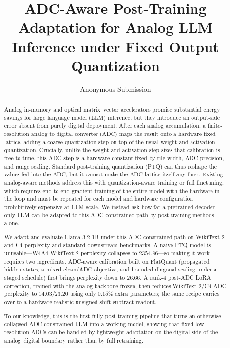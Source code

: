 \documentclass[letterpaper]{article} %
\title{ADC-Aware Post-Training Adaptation for Analog LLM Inference under Fixed Output Quantization}
\author{Anonymous Submission}
\theoremstyle{plain}
\begin{document}
\maketitle

\begin{abstract}
    Analog in-memory and optical matrix--vector accelerators promise substantial energy savings for large language model (LLM) inference, but they introduce an output-side error absent from purely digital deployment. After each analog accumulation, a finite-resolution analog-to-digital converter (ADC) maps the result onto a hardware-fixed lattice, adding a coarse quantization step on top of the usual weight and activation quantization. Crucially, unlike the weight and activation step sizes that calibration is free to tune, this ADC step is a hardware constant fixed by tile width, ADC precision, and range scaling. Standard post-training quantization (PTQ) can thus reshape the values fed into the ADC, but it cannot make the ADC lattice itself any finer. Existing analog-aware methods address this with quantization-aware training or full finetuning, which requires end-to-end gradient training of the entire model with the hardware in the loop and must be repeated for each model and hardware configuration---prohibitively expensive at LLM scale. We instead ask how far a pretrained decoder-only LLM can be adapted to this ADC-constrained path by post-training methods alone.

    We adapt and evaluate Llama-3.2-1B under this ADC-constrained path on WikiText-2 and C4 perplexity and standard downstream benchmarks. A naive PTQ model is unusable---W4A4 WikiText-2 perplexity collapses to $2354.86$---so making it work requires two ingredients. ADC-aware calibration built on FlatQuant (propagated hidden states, a mixed clean/ADC objective, and bounded diagonal scaling under a staged schedule) first brings perplexity down to $26.66$. A rank-4 post-ADC LoRA correction, trained with the analog backbone frozen, then reduces WikiText-2/C4 ADC perplexity to $14.03/23.20$ using only $0.15\%$ extra parameters; the same recipe carries over to a hardware-realistic unsigned shift-subtract readout.

    To our knowledge, this is the first fully post-training pipeline that turns an otherwise-collapsed ADC-constrained LLM into a working model, showing that fixed low-resolution ADCs can be handled by lightweight adaptation on the digital side of the analog--digital boundary rather than by full retraining.
    \end{abstract}
    
\end{document}
